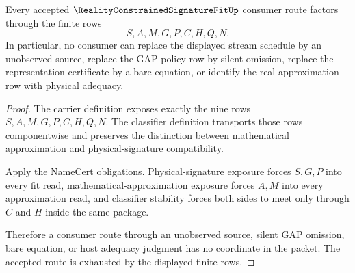 \begin{theorem}
\label{thm:reality-constrained-signature-fit-nonescape}
Every accepted $\RealityConstrainedSignatureFitUp$ consumer route factors through the finite rows
$$
S,A,M,G,P,C,H,Q,N.
$$
In particular, no consumer can replace the displayed stream schedule by an unobserved source, replace the GAP-policy row by silent omission, replace the representation certificate by a bare equation, or identify the real approximation row with physical adequacy.
\end{theorem}
\begin{proof}
The carrier definition exposes exactly the nine rows $S,A,M,G,P,C,H,Q,N$. The classifier definition transports those rows componentwise and preserves the distinction between mathematical approximation and physical-signature compatibility.

Apply the NameCert obligations. Physical-signature exposure forces $S,G,P$ into every fit read, mathematical-approximation exposure forces $A,M$ into every approximation read, and classifier stability forces both sides to meet only through $C$ and $H$ inside the same package.

Therefore a consumer route through an unobserved source, silent GAP omission, bare equation, or host adequacy judgment has no coordinate in the packet. The accepted route is exhausted by the displayed finite rows.
\end{proof}

